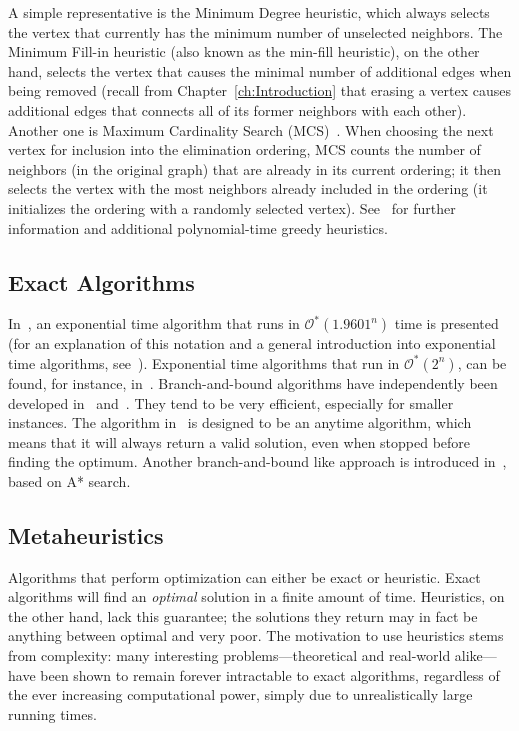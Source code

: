 \documentclass[thesis.tex]{subfiles}
\begin{document}
A simple representative is the Minimum Degree heuristic, which always selects the vertex that currently has the minimum number of unselected neighbors. The Minimum Fill-in heuristic (also known as the min-fill heuristic), on the other hand, selects the vertex that causes the minimal number of additional edges when being removed (recall from Chapter~\ref{ch:Introduction} that erasing a vertex causes additional edges that connects all of its former neighbors with each other). Another one is Maximum Cardinality Search (MCS)~\parencite{tarjan-1984-MCS}. When choosing the next vertex for inclusion into the elimination ordering, MCS counts the number of neighbors (in the original graph) that are already in its current ordering; it then selects the vertex with the most neighbors already included in the ordering (it initializes the ordering with a randomly selected vertex). See~\parencite{koster-bodlaender-hoesel-2001-treewidth} for further information and additional polynomial-time greedy heuristics.

\subsection{Exact Algorithms}
In~\parencite{exponential1}, an exponential time algorithm that runs in $\mathcal{O^{\ast}}(1.9601^n)$ time is presented (for an explanation of this notation and a general introduction into exponential time algorithms, see~\parencite{woeginger2003exact}). Exponential time algorithms that run in $\mathcal{O^{\ast}}(2^n)$, can be found, for instance, in~\parencite{held1962dynamic}.
   Branch-and-bound algorithms have independently been developed in~\parencite{gogate-2004-quickbb} and~\parencite{bachoore-bodlaender-2006-branchAndBound}. They tend to be very efficient, especially for smaller instances. The algorithm in~\parencite{gogate-2004-quickbb} is designed to be an anytime algorithm, which means that it will always return a valid solution, even when stopped before finding the optimum.
   Another branch-and-bound like approach is introduced in~\parencite{schafhauser-thesis}, based on A* search.

\subsection{Metaheuristics}
Algorithms that perform optimization can either be exact or heuristic. Exact algorithms will find an \emph{optimal} solution in a finite amount of time. Heuristics, on the other hand, lack this guarantee; the solutions they return may in fact be anything between optimal and very poor. The motivation to use heuristics stems from complexity: many interesting problems---theoretical and real-world alike---have been shown to remain forever intractable to exact algorithms, regardless of the ever increasing computational power, simply due to unrealistically large running times.~\parencite{metaheuristics-metapher-exposed}
\end{document}
